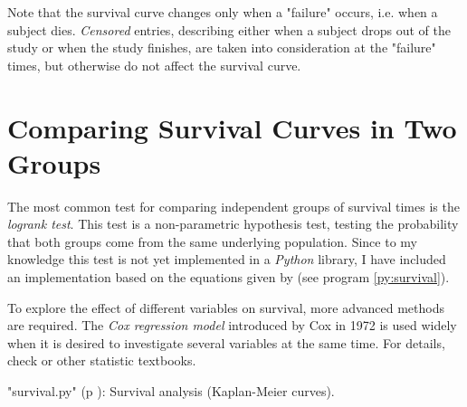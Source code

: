 Note that the survival curve changes only when a "failure" occurs, i.e. when a subject dies. \emph{Censored} entries, describing either when a subject drops out of the study or when the study finishes, are taken into consideration at the "failure" times, but otherwise do not affect the survival curve.

\section{Comparing Survival Curves in Two Groups} 

The most common test for comparing independent groups of survival times is the \emph{logrank test}. This test is a non-parametric hypothesis test, testing the probability that both groups come from the same underlying population. Since to my knowledge this test is not yet implemented in a \emph{Python} library, I have included an implementation based on the equations given by \cite{altman99} (see program \ref{py:survival}).

To explore the effect of different variables on survival, more advanced methods are required. The \emph{Cox regression model} introduced by Cox in 1972 is used widely when it is desired to investigate several variables at the same time. For details, check \cite{altman99} or other statistic textbooks.

\PyImg "survival.py" (p \pageref{py:survival}): Survival analysis (Kaplan-Meier curves).
